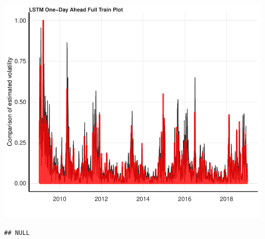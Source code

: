 \documentclass[11pt,preprint, authoryear]{elsarticle}
\let\origfigure\figure
\let\endorigfigure\endfigure
\renewenvironment{figure}[1][2] {
    \expandafter\origfigure\expandafter[H]
} {
    \endorigfigure
}
\numberwithin{equation}{section}
\numberwithin{figure}{section}
\numberwithin{table}{section}
\begin{document}
\begin{figure}[H]

{\centering \includegraphics{Essay_files/figure-latex/plot_9-1} 

}

\caption{LSTM One-Day Ahead Full Training Forecast}\label{fig:plot_9}
\end{figure}

\begin{verbatim}
## NULL
\end{verbatim}


\end{document}
